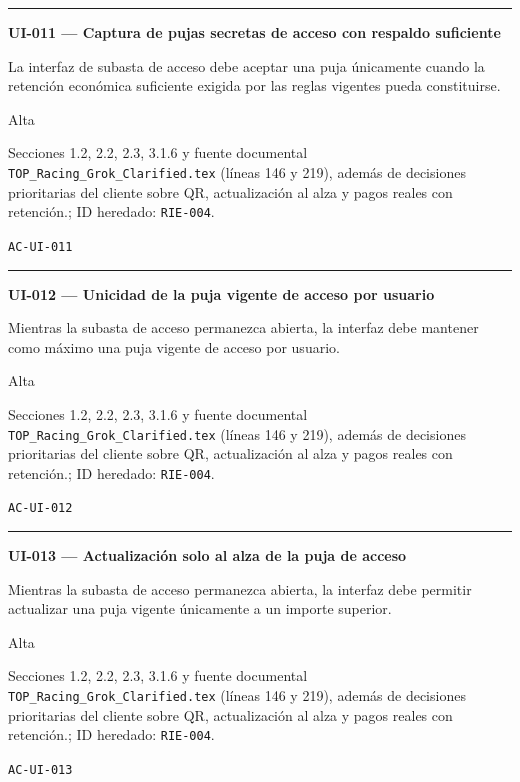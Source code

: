 \documentclass[10pt,letterpaper]{article}
\begin{document}
\vspace{0.25em}\hrule\vspace{0.65em}
\noindent\textbf{UI-011 --- Captura de pujas secretas de acceso con respaldo suficiente}\par
\begin{description}[style=nextline,leftmargin=3.15cm,labelwidth=2.8cm,font=\normalfont\bfseries]
\item[Obligación] La interfaz de subasta de acceso debe aceptar una puja únicamente cuando la retención económica suficiente exigida por las reglas vigentes pueda constituirse.
\item[Prioridad] Alta
\item[Procedencia] Secciones 1.2, 2.2, 2.3, 3.1.6 y fuente documental \texttt{TOP\_Racing\_Grok\_Clarified.tex} (líneas 146 y 219), además de decisiones prioritarias del cliente sobre QR, actualización al alza y pagos reales con retención.; ID heredado: \texttt{RIE-004}.
\item[Verificación] \texttt{AC-UI-011}
\end{description}
\vspace{0.25em}\hrule\vspace{0.65em}
\noindent\textbf{UI-012 --- Unicidad de la puja vigente de acceso por usuario}\par
\begin{description}[style=nextline,leftmargin=3.15cm,labelwidth=2.8cm,font=\normalfont\bfseries]
\item[Obligación] Mientras la subasta de acceso permanezca abierta, la interfaz debe mantener como máximo una puja vigente de acceso por usuario.
\item[Prioridad] Alta
\item[Procedencia] Secciones 1.2, 2.2, 2.3, 3.1.6 y fuente documental \texttt{TOP\_Racing\_Grok\_Clarified.tex} (líneas 146 y 219), además de decisiones prioritarias del cliente sobre QR, actualización al alza y pagos reales con retención.; ID heredado: \texttt{RIE-004}.
\item[Verificación] \texttt{AC-UI-012}
\end{description}
\vspace{0.25em}\hrule\vspace{0.65em}
\noindent\textbf{UI-013 --- Actualización solo al alza de la puja de acceso}\par
\begin{description}[style=nextline,leftmargin=3.15cm,labelwidth=2.8cm,font=\normalfont\bfseries]
\item[Obligación] Mientras la subasta de acceso permanezca abierta, la interfaz debe permitir actualizar una puja vigente únicamente a un importe superior.
\item[Prioridad] Alta
\item[Procedencia] Secciones 1.2, 2.2, 2.3, 3.1.6 y fuente documental \texttt{TOP\_Racing\_Grok\_Clarified.tex} (líneas 146 y 219), además de decisiones prioritarias del cliente sobre QR, actualización al alza y pagos reales con retención.; ID heredado: \texttt{RIE-004}.
\item[Verificación] \texttt{AC-UI-013}
\end{description}
\end{document}
